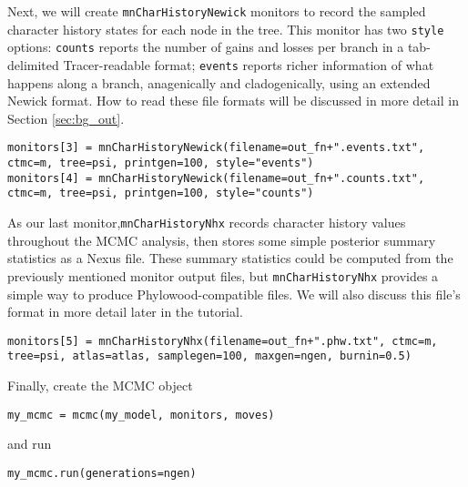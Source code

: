 Next, we will create {\tt mnCharHistoryNewick} monitors to record the sampled character history states for each node in the tree.
This monitor has two {\tt style} options: {\tt counts} reports the number of gains and losses per branch in a tab-delimited Tracer-readable format;  {\tt events} reports richer information of what happens along a branch, anagenically and cladogenically, using an extended Newick format.
How to read these file formats will be discussed in more detail in Section \ref{sec:bg_out}.

\begin{snugshade}
\begin{lstlisting}
monitors[3] = mnCharHistoryNewick(filename=out_fn+".events.txt", ctmc=m, tree=psi, printgen=100, style="events")
monitors[4] = mnCharHistoryNewick(filename=out_fn+".counts.txt", ctmc=m, tree=psi, printgen=100, style="counts")

\end{lstlisting}
\end{snugshade}

As our last monitor,{\tt mnCharHistoryNhx} records character history values throughout the MCMC analysis, then stores some simple posterior summary statistics as a Nexus file.
These summary statistics could be computed from the previously mentioned monitor output files, but {\tt mnCharHistoryNhx} provides a simple way to produce Phylowood-compatible files.
We will also discuss this file's format in more detail later in the tutorial.

\begin{snugshade}
\begin{lstlisting}
monitors[5] = mnCharHistoryNhx(filename=out_fn+".phw.txt", ctmc=m, tree=psi, atlas=atlas, samplegen=100, maxgen=ngen, burnin=0.5)
\end{lstlisting}
\end{snugshade}

Finally, create the MCMC object

\begin{snugshade}
\begin{lstlisting}
my_mcmc = mcmc(my_model, monitors, moves)
\end{lstlisting}
\end{snugshade}

and run

\begin{snugshade}
\begin{lstlisting}
my_mcmc.run(generations=ngen)
\end{lstlisting}
\end{snugshade}

